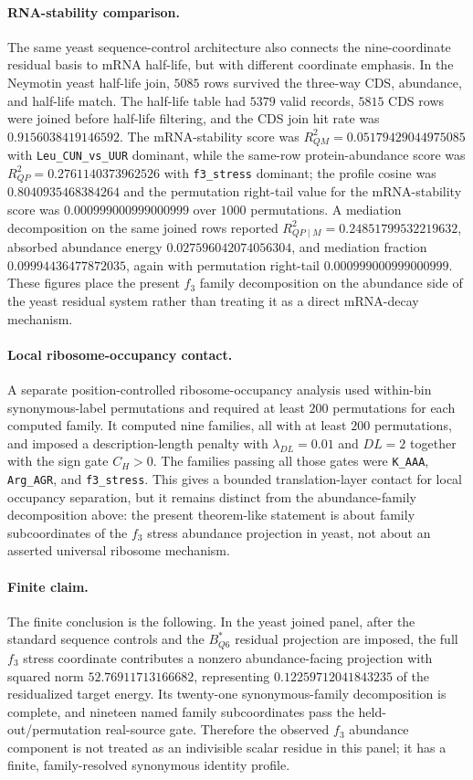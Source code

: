\paragraph{RNA-stability comparison.}
The same yeast sequence-control architecture also connects the nine-coordinate residual basis to mRNA half-life, but with different coordinate emphasis.  In the Neymotin yeast half-life join, $5085$ rows survived the three-way CDS, abundance, and half-life match.  The half-life table had $5379$ valid records, $5815$ CDS rows were joined before half-life filtering, and the CDS join hit rate was $0.9156038419146592$.  The mRNA-stability score was $R^2_{QM}=0.05179429044975085$ with \texttt{Leu\_CUN\_vs\_UUR} dominant, while the same-row protein-abundance score was $R^2_{QP}=0.2761140373962526$ with \texttt{f3\_stress} dominant; the profile cosine was $0.8040935468384264$ and the permutation right-tail value for the mRNA-stability score was $0.000999000999000999$ over $1000$ permutations.  A mediation decomposition on the same joined rows reported $R^2_{QP\mid M}=0.24851799532219632$, absorbed abundance energy $0.027596042074056304$, and mediation fraction $0.09994436477872035$, again with permutation right-tail $0.000999000999000999$.  These figures place the present $f_3$ family decomposition on the abundance side of the yeast residual system rather than treating it as a direct mRNA-decay mechanism.

\paragraph{Local ribosome-occupancy contact.}
A separate position-controlled ribosome-occupancy analysis used within-bin synonymous-label permutations and required at least $200$ permutations for each computed family.  It computed nine families, all with at least $200$ permutations, and imposed a description-length penalty with $\lambda_{DL}=0.01$ and $DL=2$ together with the sign gate $C_H>0$.  The families passing all those gates were \texttt{K\_AAA}, \texttt{Arg\_AGR}, and \texttt{f3\_stress}.  This gives a bounded translation-layer contact for local occupancy separation, but it remains distinct from the abundance-family decomposition above: the present theorem-like statement is about family subcoordinates of the $f_3$ stress abundance projection in yeast, not about an asserted universal ribosome mechanism.

\paragraph{Finite claim.}
The finite conclusion is the following.  In the yeast joined panel, after the standard sequence controls and the $B^*_{Q6}$ residual projection are imposed, the full $f_3$ stress coordinate contributes a nonzero abundance-facing projection with squared norm $52.76911713166682$, representing $0.12259712041843235$ of the residualized target energy.  Its twenty-one synonymous-family decomposition is complete, and nineteen named family subcoordinates pass the held-out/permutation real-source gate.  Therefore the observed $f_3$ abundance component is not treated as an indivisible scalar residue in this panel; it has a finite, family-resolved synonymous identity profile.


